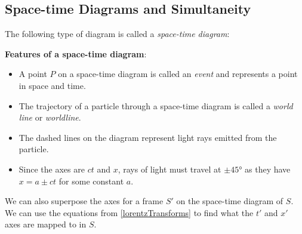 \documentclass[../main.tex]{subfiles}
\begin{document}
\subsection{Space-time Diagrams and Simultaneity}
The following type of diagram is called a \textit{space-time diagram}:
\begin{center}
\end{center}
\textbf{Features of a space-time diagram}:
\begin{itemize}
  \item A point $P$ on a space-time diagram is called an \textit{event} and represents a point in space and time.
  \item The trajectory of a particle through a space-time diagram is called a \textit{world line} or \textit{worldline}.
  \item The dashed lines on the diagram represent light rays emitted from the particle.
  \item Since the axes are $ct$ and $x$, rays of light must travel at $\pm\ang{45}$ as they have $x = a \pm ct$ for some constant $a$.
\end{itemize}
We can also superpose the axes for a frame $S'$ on the space-time diagram of $S$.
We can use the equations from \cref{lorentzTransforms} to find what the $t'$ and $x'$ axes are mapped to in $S$.
\end{document}
